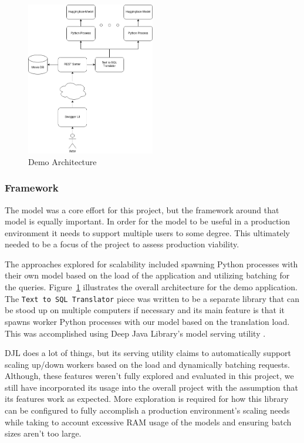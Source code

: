 \documentclass[11pt]{article}
\begin{document}
\begin{figure}
\centering
\includegraphics[width=0.5\textwidth]{demo-architecture.drawio.png}
\caption{\label{fig:architecture} Demo Architecture}
\end{figure}

\subsubsection{Framework}

The model was a core effort for this project, but the framework around that model is equally important. In order for the model to be useful in a production environment it needs to support multiple users to some degree. This ultimately needed to be a focus of the project to assess production viability.

The approaches explored for scalability included spawning Python processes with their own model based on the load of the application and utilizing batching for the queries. Figure~\ref{fig:architecture} illustrates the overall architecture for the demo application. The \texttt{Text to SQL Translator} piece was written to be a separate library that can be stood up on multiple computers if necessary and its main feature is that it spawns worker Python processes with our model based on the translation load. This was accomplished using Deep Java Library's model serving utility \citep{djlserving}.

DJL does a lot of things, but its serving utility claims to automatically support scaling up/down workers based on the load and dynamically batching requests. Although, these features weren't fully explored and evaluated in this project, we still have incorporated its usage into the overall project with the assumption that its features work as expected. More exploration is required for how this library can be configured to fully accomplish a production environment's scaling needs while taking to account excessive RAM usage of the models and ensuring batch sizes aren't too large.
\end{document}
